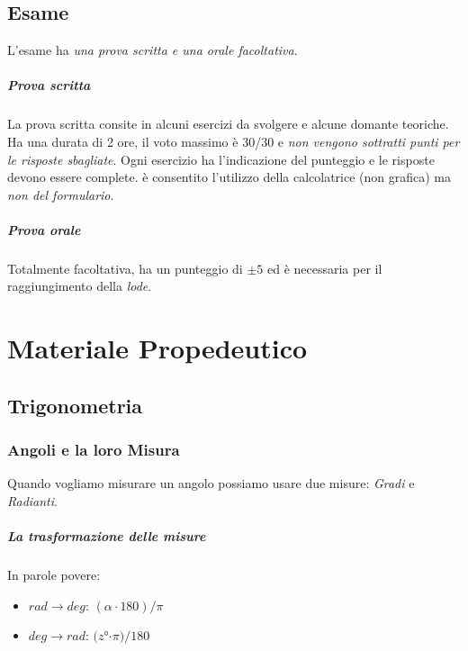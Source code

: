 \documentclass[12pt, a4paper, openany]{book}
\begin{document}
\section{Esame}
L'esame ha \emph{una prova scritta e una orale facoltativa}.
\paragraph*{Prova scritta}
La prova scritta consite in alcuni esercizi da svolgere e alcune domante teoriche.
Ha una durata di 2 ore, il voto massimo è 30/30 e \emph{non vengono sottratti punti per le risposte sbagliate}.
Ogni esercizio ha l'indicazione del punteggio e le risposte devono essere complete.
è consentito l'utilizzo della calcolatrice (non grafica) ma \emph{non del formulario}.
\paragraph*{Prova orale}
Totalmente facoltativa, ha un punteggio di $\pm 5$ ed è necessaria per il raggiungimento della \emph{lode}.

\chapter{Materiale Propedeutico}
\section{Trigonometria}
\subsection*{Angoli e la loro Misura}
Quando vogliamo misurare un angolo possiamo usare due misure: \emph{Gradi} e \emph{Radianti}.
\paragraph*{La trasformazione delle misure}
In parole povere:
\begin{itemize}
    \item $rad \to deg$: $(\alpha \cdot 180)/\pi$
    \item $deg \to rad$: $(z$°$ \cdot \pi)/180$
\end{itemize}
\end{document}
